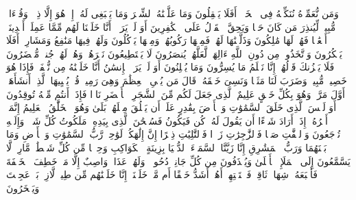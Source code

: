 وَمَن نُّعَمِّرۡهُ نُنَكِّسۡهُ فِی ٱلۡخَلۡقِۚ أَفَلَا یَعۡقِلُونَ%
\stopbuffer%
\startbuffer[\q:36:69]
وَمَا عَلَّمۡنَٰهُ ٱلشِّعۡرَ وَمَا یَنۢبَغِی لَهُۥۤۚ إِنۡ هُوَ إِلَّا ذِكۡرࣱ وَقُرۡءَانࣱ مُّبِینࣱ%
\stopbuffer%
\startbuffer[\q:36:70]
لِّیُنذِرَ مَن كَانَ حَیࣰّا وَیَحِقَّ ٱلۡقَوۡلُ عَلَى ٱلۡكَٰفِرِینَ%
\stopbuffer%
\startbuffer[\q:36:71]
أَوَ لَمۡ یَرَوۡا۟ أَنَّا خَلَقۡنَا لَهُم مِّمَّا عَمِلَتۡ أَیۡدِینَاۤ أَنۡعَٰمࣰا فَهُمۡ لَهَا مَٰلِكُونَ%
\stopbuffer%
\startbuffer[\q:36:72]
وَذَلَّلۡنَٰهَا لَهُمۡ فَمِنۡهَا رَكُوبُهُمۡ وَمِنۡهَا یَأۡكُلُونَ%
\stopbuffer%
\startbuffer[\q:36:73]
وَلَهُمۡ فِیهَا مَنَٰفِعُ وَمَشَارِبُۚ أَفَلَا یَشۡكُرُونَ%
\stopbuffer%
\startbuffer[\q:36:74]
وَٱتَّخَذُوا۟ مِن دُونِ ٱللَّهِ ءَالِهَةࣰ لَّعَلَّهُمۡ یُنصَرُونَ%
\stopbuffer%
\startbuffer[\q:36:75]
لَا یَسۡتَطِیعُونَ نَصۡرَهُمۡ وَهُمۡ لَهُمۡ جُندࣱ مُّحۡضَرُونَ%
\stopbuffer%
\startbuffer[\q:36:76]
فَلَا یَحۡزُنكَ قَوۡلُهُمۡۘ إِنَّا نَعۡلَمُ مَا یُسِرُّونَ وَمَا یُعۡلِنُونَ%
\stopbuffer%
\startbuffer[\q:36:77]
أَوَ لَمۡ یَرَ ٱلۡإِنسَٰنُ أَنَّا خَلَقۡنَٰهُ مِن نُّطۡفَةࣲ فَإِذَا هُوَ خَصِیمࣱ مُّبِینࣱ%
\stopbuffer%
\startbuffer[\q:36:78]
وَضَرَبَ لَنَا مَثَلࣰا وَنَسِیَ خَلۡقَهُۥۖ قَالَ مَن یُحۡیِ ٱلۡعِظَٰمَ وَهِیَ رَمِیمࣱ%
\stopbuffer%
\startbuffer[\q:36:79]
قُلۡ یُحۡیِیهَا ٱلَّذِیۤ أَنشَأَهَاۤ أَوَّلَ مَرَّةࣲۖ وَهُوَ بِكُلِّ خَلۡقٍ عَلِیمٌ%
\stopbuffer%
\startbuffer[\q:36:80]
ٱلَّذِی جَعَلَ لَكُم مِّنَ ٱلشَّجَرِ ٱلۡأَخۡضَرِ نَارࣰا فَإِذَاۤ أَنتُم مِّنۡهُ تُوقِدُونَ%
\stopbuffer%
\startbuffer[\q:36:81]
أَوَ لَیۡسَ ٱلَّذِی خَلَقَ ٱلسَّمَٰوَٰتِ وَٱلۡأَرۡضَ بِقَٰدِرٍ عَلَىٰۤ أَن یَخۡلُقَ مِثۡلَهُمۚ بَلَىٰ وَهُوَ ٱلۡخَلَّٰقُ ٱلۡعَلِیمُ%
\stopbuffer%
\startbuffer[\q:36:82]
إِنَّمَاۤ أَمۡرُهُۥۤ إِذَاۤ أَرَادَ شَیۡءًا أَن یَقُولَ لَهُۥ كُن فَیَكُونُ%
\stopbuffer%
\startbuffer[\q:36:83]
فَسُبۡحَٰنَ ٱلَّذِی بِیَدِهِۦ مَلَكُوتُ كُلِّ شَیۡءࣲ وَإِلَیۡهِ تُرۡجَعُونَ%
\stopbuffer%
\startbuffer[\q:37:1]
وَٱلصَّٰۤفَّٰتِ صَفࣰّا%
\stopbuffer%
\startbuffer[\q:37:2]
فَٱلزَّٰجِرَٰتِ زَجۡرࣰا%
\stopbuffer%
\startbuffer[\q:37:3]
فَٱلتَّٰلِیَٰتِ ذِكۡرًا%
\stopbuffer%
\startbuffer[\q:37:4]
إِنَّ إِلَٰهَكُمۡ لَوَٰحِدࣱ%
\stopbuffer%
\startbuffer[\q:37:5]
رَّبُّ ٱلسَّمَٰوَٰتِ وَٱلۡأَرۡضِ وَمَا بَیۡنَهُمَا وَرَبُّ ٱلۡمَشَٰرِقِ%
\stopbuffer%
\startbuffer[\q:37:6]
إِنَّا زَیَّنَّا ٱلسَّمَاۤءَ ٱلدُّنۡیَا بِزِینَةٍ ٱلۡكَوَاكِبِ%
\stopbuffer%
\startbuffer[\q:37:7]
وَحِفۡظࣰا مِّن كُلِّ شَیۡطَٰنࣲ مَّارِدࣲ%
\stopbuffer%
\startbuffer[\q:37:8]
لَّا یَسَّمَّعُونَ إِلَى ٱلۡمَلَإِ ٱلۡأَعۡلَىٰ وَیُقۡذَفُونَ مِن كُلِّ جَانِبࣲ%
\stopbuffer%
\startbuffer[\q:37:9]
دُحُورࣰاۖ وَلَهُمۡ عَذَابࣱ وَاصِبٌ%
\stopbuffer%
\startbuffer[\q:37:10]
إِلَّا مَنۡ خَطِفَ ٱلۡخَطۡفَةَ فَأَتۡبَعَهُۥ شِهَابࣱ ثَاقِبࣱ%
\stopbuffer%
\startbuffer[\q:37:11]
فَٱسۡتَفۡتِهِمۡ أَهُمۡ أَشَدُّ خَلۡقًا أَم مَّنۡ خَلَقۡنَاۤۚ إِنَّا خَلَقۡنَٰهُم مِّن طِینࣲ لَّازِبِۭ%
\stopbuffer%
\startbuffer[\q:37:12]
بَلۡ عَجِبۡتَ وَیَسۡخَرُونَ%
\stopbuffer%
